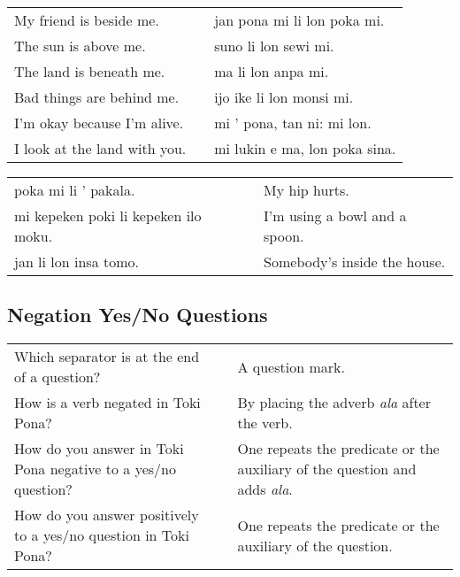 \begin{supertabular}{p{5,5cm}|ll}
    My friend is beside me.      &  & jan pona mi li lon poka mi.   \\
    The sun is above me.         &  & suno li lon sewi mi.          \\
    The land is beneath me.      &  & ma li lon anpa mi.            \\
    Bad things are behind me.    &  & ijo ike li lon monsi mi.      \\
    I'm okay because I'm alive.  &  & mi ' pona, tan ni: mi lon.    \\
    I look at the land with you. &  & mi lukin e ma, lon poka sina. \\
\end{supertabular}

\begin{supertabular}{p{5,5cm}|ll}
    poka mi li ' pakala.                 &  & My hip hurts.                 \\
    mi kepeken poki li kepeken ilo moku. &  & I'm using a bowl and a spoon. \\
    jan li lon insa tomo.                &  & Somebody's inside the house.  \\
\end{supertabular}

\newpage

\subsection*{Negation Yes/No Questions}
\label{'negation_yes_no_questions'}

\begin{supertabular}{p{5,5cm}|ll}
    Which separator is at the end of a question?                    &  & A question mark.                                                                  \\
    How is a verb negated in Toki Pona?                             &  & By placing the adverb \textit{ala} after the verb.                                \\
    How do you answer in Toki Pona negative to a yes/no question?   &  & One repeats the predicate or the auxiliary of the question and adds \textit{ala}. \\
    How do you answer positively to a yes/no question in Toki Pona? &  & One repeats the predicate or the auxiliary of the question.                       \\
\end{supertabular}

